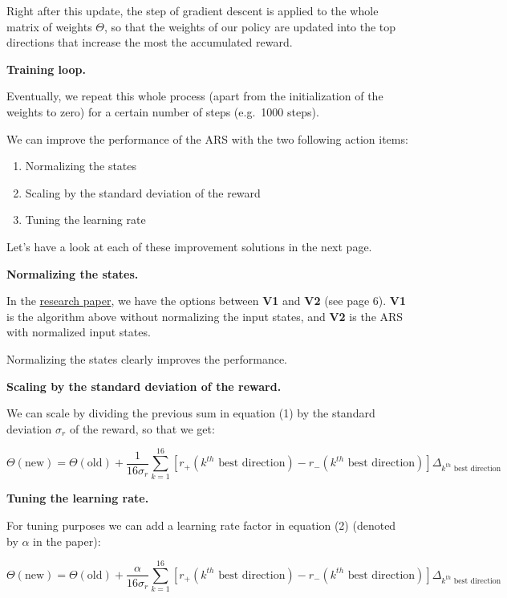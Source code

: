 \documentclass[]{book}
\begin{document}
Right after this update, the step of gradient descent is applied to the whole matrix of weights \(\Theta\), so that the weights of our policy are updated into the top directions that increase the most the accumulated reward.

\textbf{Training loop.}

Eventually, we repeat this whole process (apart from the initialization of the weights to zero) for a certain number of steps (e.g.~1000 steps).

We can improve the performance of the ARS with the two following action items:

\begin{enumerate}
    \item Normalizing the states
    \
    \item Scaling by the standard deviation of the reward
    \
    \item Tuning the learning rate
\end{enumerate}

Let's have a look at each of these improvement solutions in the next page.

\newpage

\textbf{Normalizing the states.}

In the \href{https://arxiv.org/pdf/1803.07055.pdf}{research paper}, we have the options between \textbf{V1} and \textbf{V2} (see page 6). \textbf{V1} is the algorithm above without normalizing the input states, and \textbf{V2} is the ARS with normalized input states.

Normalizing the states clearly improves the performance.

\textbf{Scaling by the standard deviation of the reward.}

We can scale by dividing the previous sum in equation (1) by the standard deviation \(\sigma_r\) of the reward, so that we get:

\begin{equation}
\Theta(\textrm{new}) = \Theta(\textrm{old}) + \frac{1}{16 \sigma_r} \sum_{k=1}^{16} [r_{+}(\textrm{$k^{th}$ best direction}) - r_{-}(\textrm{$k^{th}$ best direction})] \Delta_{\textrm{$k^{th}$ best direction}}
\end{equation}

\textbf{Tuning the learning rate.}

For tuning purposes we can add a learning rate factor in equation (2) (denoted by \(\alpha\) in the paper):

\begin{equation*}
\Theta(\textrm{new}) = \Theta(\textrm{old}) + \frac{\alpha}{16 \sigma_r} \sum_{k=1}^{16} [r_{+}(\textrm{$k^{th}$ best direction}) - r_{-}(\textrm{$k^{th}$ best direction})] \Delta_{\textrm{$k^{th}$ best direction}}
\end{equation*}
\end{document}
